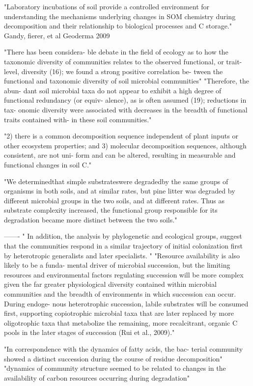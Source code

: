 "Laboratory incubations of soil provide a controlled environment for understanding the mechanisms underlying changes in SOM chemistry during decomposition and their relationship to biological processes and C storage." Gandy, fierer, et al Geoderma 2009 

"There has been considera- ble debate in the field of ecology as to how the taxonomic diversity of communities relates to the observed functional, or trait-level, diversity (16); we found a strong positive correlation be- tween the functional and taxonomic diversity of soil microbial communities"\cite{Fierer_2013}
"Therefore, the abun- dant soil microbial taxa do not appear to exhibit a high degree of functional redundancy (or equiv- alence), as is often assumed (19); reductions in tax- onomic diversity were associated with decreases in the breadth of functional traits contained with- in these soil communities."\cite{Fierer_2013}

"2) there is a common decomposition sequence independent of plant inputs or other ecosystem properties; and 3) molecular decomposition sequences, although consistent, are not uni- form and can be altered, resulting in measurable and functional changes in soil C."\cite{Grandy_2008}

"We determinedthat simple substrateswere degradedby the same groups of organisms in both soils, and at similar rates, but pine litter was degraded by different microbial groups in the two soils, and at different rates. Thus as substrate complexity increased, the functional group responsible for its degradation became more distinct between the two soils."\cite{Waldrop_2004}



-------
" In addition, the analysis by phylogenetic and ecological groups, suggest that the communities respond in a similar trajectory of initial colonization first by heterotropic generalists and later specialists. "\cite{L_pez_Lozano_2013}
"Resource availability is also likely to be a funda- mental driver of microbial succession, but the limiting resources and environmental factors regulating succession will be more complex given the far greater physiological diversity contained within microbial communities and the breadth of environments in which succession can occur. During endoge- nous heterotrophic succession, labile substrates will be consumed first, supporting copiotrophic microbial taxa that are later replaced by more oligotrophic taxa that metabolize the remaining, more recalcitrant, organic C pools in the later stages of succession (Rui et al., 2009)."\cite{Fierer_2010}

"In correspondence with the dynamics of fatty acids, the bac- terial community showed a distinct succession during the course of residue decomposition"\cite{Rui_2009}
"dynamics of community structure seemed to be related to changes in the availability of carbon resources occurring during degradation"\cite{Bastian_2009}
